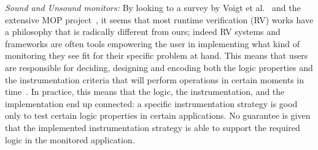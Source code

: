 

\newcommand\sepItems{\saveSpace\saveSpace\saveSpace\\*${}_{}$\\*${}_{}\,\bullet\,$}

\noindent\textit{Sound and Unsound monitors:}
By looking to a survey by Voigt et al.~\cite{Voigt2013} and the extensive MOP project~\cite{meredith2012overview},
it seems that most runtime verification (RV) works have a philosophy that is radically different from ours;
indeed RV systems and frameworks are often tools empowering the user
in implementing what kind of monitoring they see fit for their specific problem at hand.
This means that users are responsible for deciding, designing and encoding both the 
logic properties and the instrumentation criteria that will perform operations
in certain moments in time~\cite{meredith2012overview}.
In practice, this means that the logic, the instrumentation, and the implementation end up connected:
a specific instrumentation strategy is good only to test certain logic properties in certain applications.
No guarantee is given that the implemented instrumentation strategy is able to support
the required logic in the monitored application.

%
%

